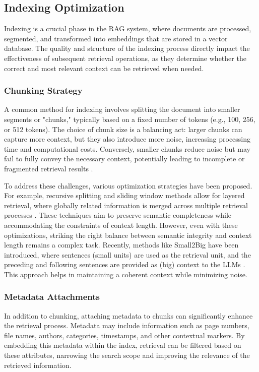 \subsection{Indexing Optimization}

Indexing is a crucial phase in the RAG system, where documents are processed, segmented, and transformed into embeddings that are stored in a vector database. The quality and structure of the indexing process directly impact the effectiveness of subsequent retrieval operations, as they determine whether the correct and most relevant context can be retrieved when needed.

\subsubsection{Chunking Strategy}

A common method for indexing involves splitting the document into smaller segments or "chunks," typically based on a fixed number of tokens (e.g., 100, 256, or 512 tokens). The choice of chunk size is a balancing act: larger chunks can capture more context, but they also introduce more noise, increasing processing time and computational costs. Conversely, smaller chunks reduce noise but may fail to fully convey the necessary context, potentially leading to incomplete or fragmented retrieval results \cite{teja2023chunk}.

To address these challenges, various optimization strategies have been proposed. For example, recursive splitting and sliding window methods allow for layered retrieval, where globally related information is merged across multiple retrieval processes \cite{langchain2023recursive}. These techniques aim to preserve semantic completeness while accommodating the constraints of context length. However, even with these optimizations, striking the right balance between semantic integrity and context length remains a complex task. Recently, methods like Small2Big have been introduced, where sentences (small units) are used as the retrieval unit, and the preceding and following sentences are provided as (big) context to the LLMs \cite{yang2023smalltobig}. This approach helps in maintaining a coherent context while minimizing noise.

\subsubsection{Metadata Attachments}

In addition to chunking, attaching metadata to chunks can significantly enhance the retrieval process. Metadata may include information such as page numbers, file names, authors, categories, timestamps, and other contextual markers. By embedding this metadata within the index, retrieval can be filtered based on these attributes, narrowing the search scope and improving the relevance of the retrieved information. 

